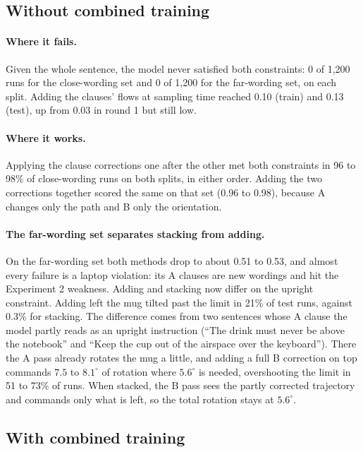 \documentclass[11pt]{article}
\begin{document}
\subsection{Without combined training}

\paragraph{Where it fails.} Given the whole sentence, the model never satisfied both constraints:
0 of 1{,}200 runs for the close-wording set and 0 of 1{,}200 for the far-wording set, on each split. Adding the clauses' flows at
sampling time reached 0.10 (train) and 0.13 (test), up from 0.03 in round 1 but still low.

\paragraph{Where it works.} Applying the clause corrections one after the other met both constraints in
96 to 98\% of close-wording runs on both splits, in either order. Adding the two corrections together scored
the same on that set (0.96 to 0.98), because A changes only the path and B only the orientation.

\paragraph{The far-wording set separates stacking from adding.} On the far-wording set both methods drop
to about 0.51 to 0.53, and almost every failure is a laptop violation: its A clauses are new wordings and hit the Experiment 2
weakness. Adding and stacking now differ on the upright constraint. Adding left the mug tilted past the
limit in 21\% of test runs, against 0.3\% for stacking. The difference comes from two sentences whose A
clause the model partly reads as an upright instruction (``The drink must never be above the notebook''
and ``Keep the cup out of the airspace over the keyboard''). There the A pass already rotates the mug a
little, and adding a full B correction on top commands $7.5$ to $8.1^\circ$ of rotation where $5.6^\circ$
is needed, overshooting the limit in 51 to 73\% of runs. When stacked, the B pass sees the partly
corrected trajectory and commands only what is left, so the total rotation stays at $5.6^\circ$.

\subsection{With combined training}
\end{document}
